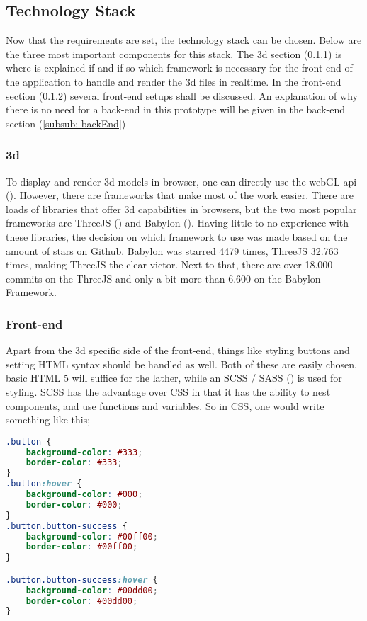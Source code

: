\subsection{Technology Stack}
Now that the requirements are set, the technology stack can be chosen. Below are the three most important components for this stack. The 3d section (\ref{subsub: 3d}) is where is explained if and if so which framework is necessary for the front-end of the application to handle and render the 3d files in realtime. In the front-end section (\ref{subsub: frontEnd}) several front-end setups shall be discussed. An explanation of why there is no need for a back-end in this prototype will be given in the back-end section (\ref{subsub: backEnd})

\subsubsection{3d}
\label{subsub: 3d}
To display and render 3d models in browser, one can directly use the webGL api (\cite{webGL}). However, there are frameworks that make most of the work easier. There are loads of libraries that offer 3d capabilities in browsers, but the two most popular frameworks are ThreeJS (\cite{threejs}) and Babylon (\cite{babylon}). Having little to no experience with these libraries, the decision on which framework to use was made based on the amount of stars on Github. Babylon was starred 4479 times, ThreeJS 32.763 times, making ThreeJS the clear victor. Next to that, there are over 18.000 commits on the ThreeJS and only a bit more than 6.600 on the Babylon Framework.

\subsubsection{Front-end}
\label{subsub: frontEnd}
Apart from the 3d specific side of the front-end, things like styling buttons and setting HTML syntax should be handled as well. Both of these are easily chosen, basic HTML 5 will suffice for the lather, while an SCSS / SASS (\cite{scss}) is used for styling. SCSS has the advantage over CSS in that it has the ability to nest components, and use functions and variables. So in CSS, one would write something like this;

\begin{lstlisting}[language=CSS]
.button {
	background-color: #333;
	border-color: #333;
}
.button:hover {
	background-color: #000;
	border-color: #000;
}
.button.button-success {
	background-color: #00ff00;
	border-color: #00ff00;
}

.button.button-success:hover {
	background-color: #00dd00;
	border-color: #00dd00;
}
\end{lstlisting}

